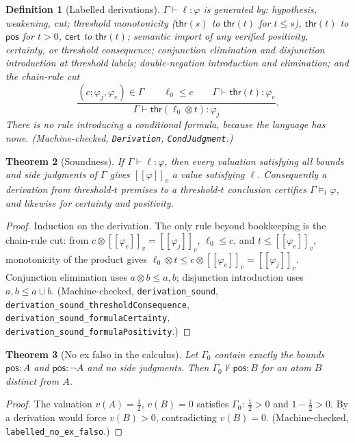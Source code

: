 \documentclass[11pt,a4paper]{article}
\newtheorem{theorem}{Theorem}[section]
\newtheorem{definition}[theorem]{Definition}
\newcommand{\conjc}{\otimes}
\newcommand{\disjc}{\sqcup}
\newcommand{\evalc}[2]{[\![ {#2} ]\!]_{#1}}
\begin{document}
\begin{definition}[Labelled derivations]
\label{def:derivation}
$\Gamma \vdash \ell : \varphi$ is generated by: hypothesis, weakening,
cut; threshold monotonicity
($\mathsf{thr}(s)$ to $\mathsf{thr}(t)$ for $t \leq s$),
$\mathsf{thr}(t)$ to $\mathsf{pos}$ for $t > 0$, $\mathsf{cert}$ to
$\mathsf{thr}(t)$; semantic import of any verified positivity,
certainty, or threshold consequence; conjunction elimination and
disjunction introduction at threshold labels; double-negation
introduction and elimination; and the \emph{chain-rule cut}
\[
  \frac{(c; \varphi_j, \varphi_e) \in \Gamma
        \qquad \ell_0 \leq c
        \qquad \Gamma \vdash \mathsf{thr}(t) : \varphi_e}
       {\Gamma \vdash \mathsf{thr}(\ell_0 \conjc t) : \varphi_j}.
\]
There is no rule introducing a conditional formula, because the
language has none.
(Machine-checked, \texttt{Derivation}, \texttt{CondJudgment}.)
\end{definition}

\begin{theorem}[Soundness]
\label{thm:seq-sound}
If $\Gamma \vdash \ell : \varphi$, then every valuation satisfying all
bounds and side judgments of $\Gamma$ gives $\evalc{v}{\varphi}$ a
value satisfying $\ell$.
Consequently a derivation from threshold-$t$ premises to a
threshold-$t$ conclusion certifies $\Gamma \models_t \varphi$, and
likewise for certainty and positivity.
\end{theorem}
\begin{proof}
Induction on the derivation.
The only rule beyond bookkeeping is the chain-rule cut: from
$c \conjc \evalc{v}{\varphi_e} = \evalc{v}{\varphi_j}$,
$\ell_0 \leq c$, and $t \leq \evalc{v}{\varphi_e}$, monotonicity of the
product gives
$\ell_0 \conjc t \leq c \conjc \evalc{v}{\varphi_e}
  = \evalc{v}{\varphi_j}$.
Conjunction elimination uses $a \conjc b \leq a, b$; disjunction
introduction uses $a, b \leq a \disjc b$.
(Machine-checked, \texttt{derivation\_sound},
\texttt{derivation\_sound\_thresholdConsequence},
\texttt{derivation\_sound\_formulaCertainty},
\texttt{derivation\_sound\_formulaPositivity}.)
\end{proof}

\begin{theorem}[No ex falso in the calculus]
\label{thm:no-ex-falso}
Let $\Gamma_0$ contain exactly the bounds $\mathsf{pos} : A$ and
$\mathsf{pos} : \neg A$ and no side judgments.
Then $\Gamma_0 \nvdash \mathsf{pos} : B$ for an atom $B$ distinct
from $A$.
\end{theorem}
\begin{proof}
The valuation $v(A) = \tfrac12$, $v(B) = 0$ satisfies $\Gamma_0$:
$\tfrac12 > 0$ and $1 - \tfrac12 > 0$.
By  a derivation would force $v(B) > 0$,
contradicting $v(B) = 0$.
(Machine-checked, \texttt{labelled\_no\_ex\_falso}.)
\end{proof}
\end{document}
